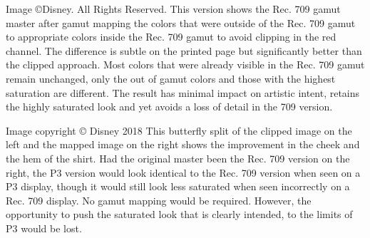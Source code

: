 Image ©Disney. All Rights Reserved.
This version shows the Rec. 709 gamut master after gamut mapping the colors that were outside of the Rec. 709 gamut to appropriate colors inside the Rec. 709 gamut to avoid clipping in the red channel. The difference is subtle on the printed page but significantly better than the clipped approach. Most colors that were already visible in the Rec. 709 gamut remain unchanged, only the out of gamut colors and those with the highest saturation are different. The result has minimal impact on artistic intent, retains the highly saturated look and yet avoids a loss of detail in the 709 version.


Image copyright © Disney 2018
This butterfly split of the clipped image on the left and the mapped image on the right shows the improvement in the cheek and the hem of the shirt. Had the original master been the Rec. 709 version on the right, the P3 version would look identical to the Rec. 709 version when seen on a P3 display, though it would still look less saturated when seen incorrectly on a Rec. 709 display. No gamut mapping would be required. However, the opportunity to push the saturated look that is clearly intended, to the limits of P3 would be lost.

